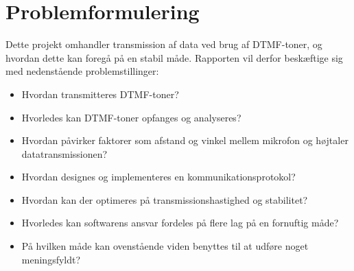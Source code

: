 \newpage
\section{Problemformulering}
Dette projekt omhandler transmission af data ved brug af DTMF-toner, og hvordan dette kan foregå på en stabil måde. Rapporten vil derfor beskæftige sig med nedenstående problemstillinger:

\begin{itemize}[noitemsep]
	\item	Hvordan transmitteres DTMF-toner?
	\item	Hvorledes kan DTMF-toner opfanges og analyseres?
	\item 	Hvordan påvirker faktorer som afstand og vinkel mellem mikrofon og højtaler datatransmissionen?
	\item   Hvordan designes og implementeres en kommunikationsprotokol?
	\item 	Hvordan kan der optimeres på transmissionshastighed og stabilitet?
	\item 	Hvorledes kan softwarens ansvar fordeles på flere lag på en fornuftig måde?
	\item 	På hvilken måde kan ovenstående viden benyttes til at udføre noget meningsfyldt?
\end{itemize}

